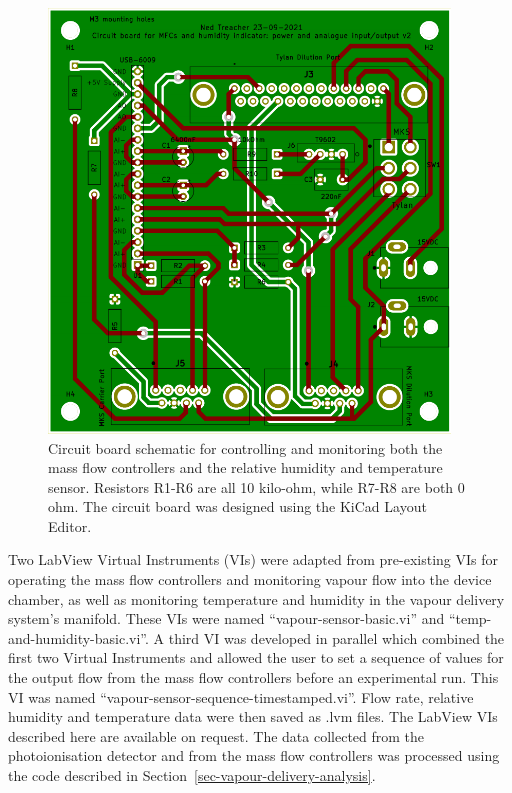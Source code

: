 \documentclass[
  a4paper,
]{scrbook}
\begin{document}
\begin{figure}

{\centering \includegraphics[width=0.95\textwidth,height=\textheight]{figures/ch8/current_PCB.png}

}

\caption[Circuit board schematic for controlling and monitoring both the
mass flow controllers and the relative humidity and temperature
sensor.]{\label{fig-current-pcb-design}Circuit board schematic for
controlling and monitoring both the mass flow controllers and the
relative humidity and temperature sensor. Resistors R1-R6 are all 10
kilo-ohm, while R7-R8 are both 0 ohm. The circuit board was designed
using the KiCad Layout Editor.}

\end{figure}

Two LabView Virtual Instruments (VIs) were adapted from pre-existing VIs
for operating the mass flow controllers and monitoring vapour flow into
the device chamber, as well as monitoring temperature and humidity in
the vapour delivery system's manifold. These VIs were named
``vapour-sensor-basic.vi'' and ``temp-and-humidity-basic.vi''. A third
VI was developed in parallel which combined the first two Virtual
Instruments and allowed the user to set a sequence of values for the
output flow from the mass flow controllers before an experimental run.
This VI was named ``vapour-sensor-sequence-timestamped.vi''. Flow rate,
relative humidity and temperature data were then saved as .lvm files.
The LabView VIs described here are available on request. The data
collected from the photoionisation detector and from the mass flow
controllers was processed using the code described in
Section~\ref{sec-vapour-delivery-analysis}.
\end{document}
